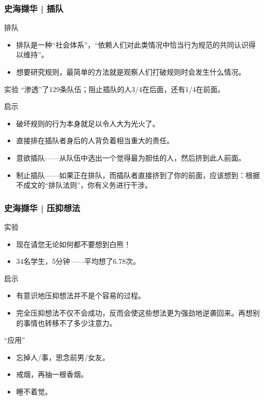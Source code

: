 \begin{frame}
  \frametitle{史海撷华 | 插队}
  \vspace{-0.7em}
  \begin{block}{排队}
    \begin{itemize}
      \item 排队是一种“社会体系”，“依赖人们对此类情况中恰当行为规范的共同认识得以维持”。
      \item 想要研究规则，最简单的方法就是观察人们打破规则时会发生什么情况。
    \end{itemize}
  \end{block}
  \vspace{-0.7em}
  \pause
  \begin{block}{实验}
    “渗透”了129条队伍；阻止插队的人3/4在后面，还有1/4在前面。
  \end{block}
  \vspace{-0.7em}
  \pause
  \begin{block}{启示}
    \begin{itemize}
      \item 破坏规则的行为本身就足以令人大为光火了。
      \item 直接排在插队者身后的人背负着相当重大的责任。
      \item 意欲插队——从队伍中选出一个觉得最为胆怯的人，然后挤到此人前面。
      \item 制止插队——如果正在排队，而插队者直接挤到了你的前面，应该想到：根据不成文的“排队法则”，你有义务进行干涉。
    \end{itemize}
  \end{block}
\end{frame}

\begin{frame}
  \frametitle{史海撷华 | 压抑想法}
  \begin{block}{实验}
    \begin{itemize}
      \item 现在请您无论如何都不要想到白熊！
      \item 34名学生，5分钟——平均想了6.78次。
    \end{itemize}
  \end{block}
  \pause
  \begin{block}{启示}
    \begin{itemize}
      \item 有意识地压抑想法并不是个容易的过程。
      \item 完全压抑想法不仅不会成功，反而会使这些想法更为强劲地逆袭回来。再想别的事情也转移不了多少注意力。
    \end{itemize}
  \end{block}
  \pause
  \begin{block}{“应用”}
    \begin{itemize}
      \item 忘掉人/事，思念前男/女友。
      \item 戒烟，再抽一根香烟。
      \item 睡不着觉。
    \end{itemize}
  \end{block}
\end{frame}

